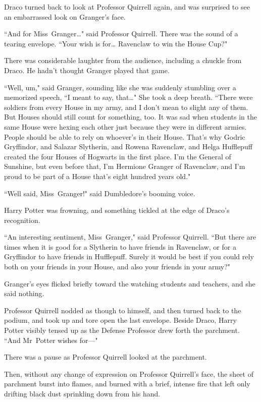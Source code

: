 Draco turned back to look at Professor Quirrell again, and was surprised to see an embarrassed look on Granger's face.

``And for Miss~Granger{\ldots}" said Professor Quirrell. There was the sound of a tearing envelope. ``Your wish is for{\ldots} Ravenclaw to win the House Cup?"

There was considerable laughter from the audience, including a chuckle from Draco. He hadn't thought Granger played that game.

``Well, um," said Granger, sounding like she was suddenly stumbling over a memorized speech, ``I meant to say, that{\ldots}" She took a deep breath. ``There were soldiers from every House in my army, and I don't mean to slight any of them. But Houses should still count for something, too. It was sad when students in the same House were hexing each other just because they were in different armies. People should be able to rely on whoever's in their House. That's why Godric Gryffindor, and Salazar Slytherin, and Rowena Ravenclaw, and Helga Hufflepuff created the four Houses of Hogwarts in the first place. I'm the General of Sunshine, but even before that, I'm Hermione Granger of Ravenclaw, and I'm proud to be part of a House that's eight hundred years old."

``Well said, Miss~Granger!" said Dumbledore's booming voice.

Harry Potter was frowning, and something tickled at the edge of Draco's recognition.

``An interesting sentiment, Miss~Granger," said Professor Quirrell. ``But there are times when it is good for a Slytherin to have friends in Ravenclaw, or for a Gryffindor to have friends in Hufflepuff. Surely it would be best if you could rely both on your friends in your House, and also your friends in your army?"

Granger's eyes flicked briefly toward the watching students and teachers, and she said nothing.

Professor Quirrell nodded as though to himself, and then turned back to the podium, and took up and tore open the last envelope. Beside Draco, Harry Potter visibly tensed up as the Defense Professor drew forth the parchment. ``And Mr~Potter wishes for—"

There was a pause as Professor Quirrell looked at the parchment.

Then, without any change of expression on Professor Quirrell's face, the sheet of parchment burst into flames, and burned with a brief, intense fire that left only drifting black dust sprinkling down from his hand.

